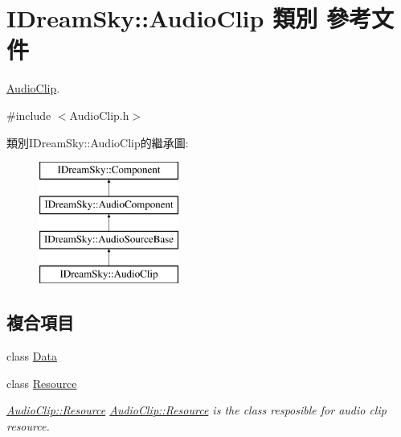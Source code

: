 \hypertarget{class_i_dream_sky_1_1_audio_clip}{}\section{I\+Dream\+Sky\+:\+:Audio\+Clip 類別 參考文件}
\label{class_i_dream_sky_1_1_audio_clip}


\hyperlink{class_i_dream_sky_1_1_audio_clip}{Audio\+Clip}.  




{\ttfamily \#include $<$Audio\+Clip.\+h$>$}

類別\+I\+Dream\+Sky\+:\+:Audio\+Clip的繼承圖\+:\begin{figure}[H]
\begin{center}
\leavevmode
\includegraphics[height=4.000000cm]{class_i_dream_sky_1_1_audio_clip}
\end{center}
\end{figure}
\subsection*{複合項目}
\begin{DoxyCompactItemize}
\item 
class \hyperlink{class_i_dream_sky_1_1_audio_clip_1_1_data}{Data}
\item 
class \hyperlink{class_i_dream_sky_1_1_audio_clip_1_1_resource}{Resource}
\begin{DoxyCompactList}\small\item\em \hyperlink{class_i_dream_sky_1_1_audio_clip_1_1_resource}{Audio\+Clip\+::\+Resource} \hyperlink{class_i_dream_sky_1_1_audio_clip_1_1_resource}{Audio\+Clip\+::\+Resource} is the class resposible for audio clip resource. \end{DoxyCompactList}\end{DoxyCompactItemize}
